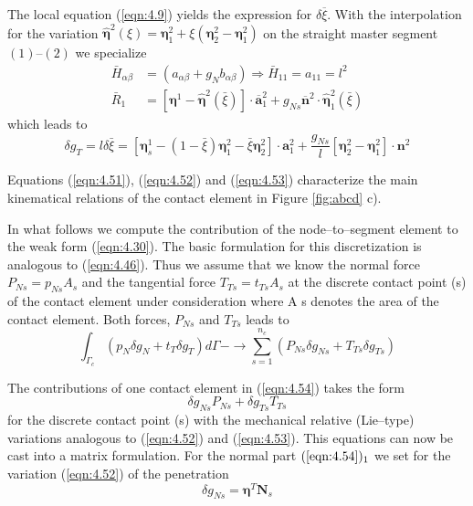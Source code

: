 The local equation (\ref{eqn:4.9}) yields the expression for $\delta \overline{\xi}$.  With the interpolation for the variation $\hat{\boldsymbol{\eta}}^{2}(\xi)=\boldsymbol{\eta}_{1}^{2}+\xi\left(\boldsymbol{\eta}_{2}^{2}-\boldsymbol{\eta}_{1}^{2}\right) $ on the straight master segment $(1)–(2) $ we specialize
\begin{equation}
 \begin{aligned} \bar{H}_{\alpha \beta} &=\left(a_{\alpha \beta}+g_{N} b_{\alpha \beta}\right) \Longrightarrow \bar{H}_{11}=a_{11}=l^{2} \\ \bar{R}_{1} &=\left[\boldsymbol{\eta}^{1}-\hat{\boldsymbol{\eta}}^{2}(\bar{\xi})\right] \cdot \overline{\mathbf{a}}_{1}^{2}+g_{N s} \overline{\mathbf{n}}^{2} \cdot \hat{\boldsymbol{\eta}}_{1}^{2}(\bar{\xi}) \end{aligned} 
\end{equation}
which leads to
\begin{equation}
 \delta g_{T}=l \delta \bar{\xi}=\left[\boldsymbol{\eta}_{s}^{1}-(1-\bar{\xi}) \boldsymbol{\eta}_{1}^{2}-\bar{\xi} \boldsymbol{\eta}_{2}^{2}\right] \cdot \mathbf{a}_{1}^{2}+\frac{g_{N s}}{l}\left[\boldsymbol{\eta}_{2}^{2}-\boldsymbol{\eta}_{1}^{2}\right] \cdot \mathbf{n}^{2} 
\label{eqn:4.53}
\end{equation}

Equations (\ref{eqn:4.51}), (\ref{eqn:4.52}) and (\ref{eqn:4.53}) characterize the main kinematical relations of the contact
element in Figure \ref{fig:abcd} c).

In what follows we compute the contribution of the node–to–segment element to the weak
form (\ref{eqn:4.30}). The basic formulation for this discretization is analogous to (\ref{eqn:4.46}). Thus we assume
that we know the normal force $P _{N s} = p_ {N s} A_ s$ and the tangential force $T_{ T s} = t_ {T s} A _s$ at the
discrete contact point (s) of the contact element under consideration where A s denotes the
area of the contact element. Both forces, $P _{N s}$ and $ T_{Ts}$  leads to
\begin{equation}
 \int_{\Gamma_{c}}\left(p_{N} \delta g_{N}+t_{T} \delta g_{T}\right) d \Gamma-\longrightarrow \sum_{s=1}^{n_{c}}\left(P_{N s} \delta g_{N s}+T_{T s} \delta g_{T s}\right) 
 \label{eqn:4.54}
\end{equation}

 The contributions of one contact element in (\ref{eqn:4.54}) takes the form 
\begin{equation}
 \delta g_{N s} P_{N s}+\delta g_{T s} T_{T s} 
 \label{eqn:4.55}
\end{equation}
for the discrete contact point (s) with the mechanical relative (Lie–type) variations analogous
to (\ref{eqn:4.52}) and (\ref{eqn:4.53}). This equations can now be cast into a matrix formulation. For the normal
part $(\ref{eqn:4.54})_ 1$ we set for the variation (\ref{eqn:4.52}) of the penetration
\begin{equation}
 \delta g_{N s}=\mathbf{\eta}^{T} \mathbf{N}_{s} 
 \label{eqn:4.56}
\end{equation}

